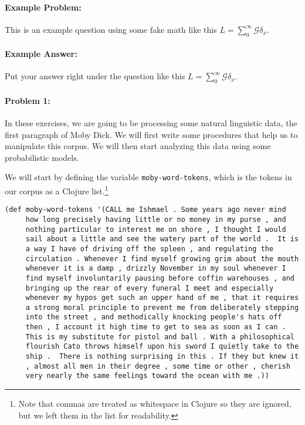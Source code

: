 \documentclass[10pt]{article}
\begin{document}
\noindent\hrulefill %

\paragraph{Example Problem:}
This is an example question using some fake math like this
$L=\sum_0^{\infty} \mathcal{G} \delta_x$.

\paragraph{Example Answer:} Put your answer right under the question like
this $L=\sum_0^{\infty} \mathcal{G} \delta_x$.

\noindent\hrulefill%

\pagebreak%

\noindent\hrulefill %

\paragraph{Problem 1:}

In these exercises, we are going to be processing some natural
linguistic data, the first paragraph of Moby Dick. We will first write
some procedures that help us to manipulate this corpus. We will then
start analyzing this data using some probabilistic models.

We will start by defining the variable \texttt{moby-word-tokens},
which is the tokens in our corpus as a Clojure list.\footnote{Note
that commas are treated as whitespace in Clojure so they are ignored, but
we left them in the list for readability.}

\begin{lstlisting}
(def moby-word-tokens '(CALL me Ishmael . Some years ago never mind
     how long precisely having little or no money in my purse , and
     nothing particular to interest me on shore , I thought I would
     sail about a little and see the watery part of the world .  It is
     a way I have of driving off the spleen , and regulating the
     circulation . Whenever I find myself growing grim about the mouth
     whenever it is a damp , drizzly November in my soul whenever I
     find myself involuntarily pausing before coffin warehouses , and
     bringing up the rear of every funeral I meet and especially
     whenever my hypos get such an upper hand of me , that it requires
     a strong moral principle to prevent me from deliberately stepping
     into the street , and methodically knocking people's hats off
     then , I account it high time to get to sea as soon as I can .
     This is my substitute for pistol and ball . With a philosophical
     flourish Cato throws himself upon his sword I quietly take to the
     ship .  There is nothing surprising in this . If they but knew it
     , almost all men in their degree , some time or other , cherish
     very nearly the same feelings toward the ocean with me .))
\end{lstlisting}
\end{document}

